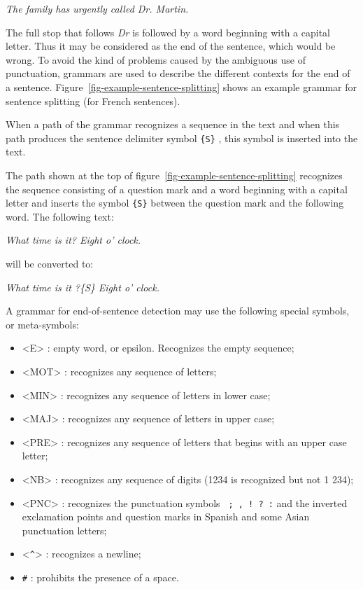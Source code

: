 \bigskip
\textit{The family has urgently called Dr. Martin.}

\bigskip \noindent The full stop that follows \textit{Dr} is followed by a word
beginning with a capital letter. Thus it may be considered as the end of the
sentence, which would be wrong. To avoid the kind of problems caused by the
ambiguous use of punctuation, grammars are used to  describe the different
contexts for the end of a sentence.
Figure~\ref{fig-example-sentence-splitting} shows an example grammar for
sentence splitting (for French sentences).

\bigskip
\noindent When a path of the grammar recognizes a sequence in the text and when
this path produces the sentence delimiter symbol \verb+{S}+
, this symbol is inserted into the
text.

\bigskip
\noindent The path shown at the top of
figure~\ref{fig-example-sentence-splitting} recognizes the sequence consisting
of a question mark and a word beginning with a capital letter and inserts the 
symbol \verb+{S}+ between the question mark and
the following word. The following text:

\bigskip
\textit{What time is it? Eight o' clock.}

\bigskip
\noindent will be converted to:

\bigskip
\textit{What time is it ?\{S\} Eight o' clock.}

\bigskip
\noindent A  grammar for end-of-sentence detection may use the following
special symbols, or meta-symbols:

\index{\verb+<^>+}\index{\verb+#+}
\begin{itemize}
  \item <E> : empty word, or epsilon. Recognizes the empty sequence;
  \item <MOT> : recognizes any sequence of letters;
  \item <MIN> : recognizes any sequence of letters in lower case;
  \item <MAJ> : recognizes any sequence of letters in upper case;
  \item <PRE> : recognizes any sequence of letters that begins with an upper case letter;
  \item <NB> : recognizes any sequence of digits (1234 is recognized but not 1
  234); \item <PNC> : recognizes the punctuation symbols \verb+ ; , ! ? :+ and the
  inverted exclamation points and question marks in Spanish and some Asian
  punctuation letters; \item <\verb+^+> : recognizes a newline; \item \verb+#+ :
  prohibits the presence of a space.
\end{itemize}

